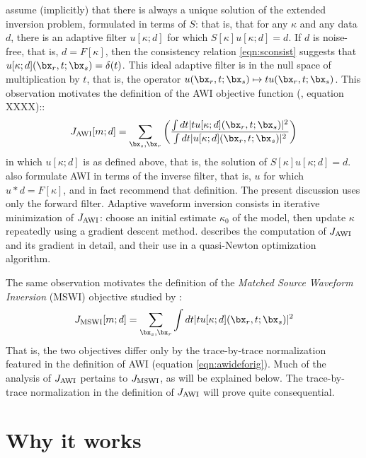 \cite{Warner:16} assume (implicitly) that there is always a unique
solution of the extended inversion problem, formulated in terms of
$S$: that is, that
for any $\kappa$ and any data $d$, there is an
adaptive filter $u[\kappa;d]$ for which
$S[\kappa]u[\kappa;d]= d$. If $d$ is noise-free, that is, $d=F[\kappa]$, then the consistency relation \ref{eqn:sconsist}
suggests that $u[\kappa;d](\bx_r,t;\bx_s) = \delta(t)$. This ideal adaptive filter is in the null
space of multiplication by $t$, that is, the operator
$u(\bx_r,t;\bx_s) \mapsto t u(\bx_r,t;\bx_s)$. This
observation motivates the definition of the AWI objective function
(\cite{Warner:16}, equation XXXX)::
\begin{equation}
  \label{eqn:awideforig}
  J_{\rm AWI}[m;d] = \sum_{\bx_s,\bx_r} \left(\frac{\int dt |tu[\kappa;d](\bx_r,t;\bx_s)|^2}{\int dt |u[\kappa;d](\bx_r,t;\bx_s)|^2}\right) 
\end{equation}
in which $u[\kappa;d]$ is as defined above, that is, the solution of $S[\kappa]u[\kappa;d]
= d$. \cite{Warner:16} also formulate
AWI in terms of the inverse filter, that is, $u$ for which
$u*d = F[\kappa]$, and in fact recommend that definition. The present
discussion uses only the forward filter.
Adaptive waveform inversion consists in iterative minimization of
$J_{\rm AWI}$: choose an initial estimate $\kappa_0$ of the
model, then update $\kappa$ repeatedly using a gradient
descent method. \cite{Warner:16} describes the computation of $J_{\rm AWI}$
and its gradient in detail, and their use in a quasi-Newton
optimization algorithm.

The same observation motivates the definition of the {\em Matched
  Source Waveform Inversion} (MSWI) objective studied by
\cite{HuangSymes2015SEG,HuangSymes:Geo17}:
\begin{equation}
  \label{eqn:mswideforig}
  J_{\rm MSWI}[m;d] = \sum_{\bx_s,\bx_r} \int dt |tu[\kappa;d](\bx_r,t;\bx_s)|^2
\end{equation}
That is, the two objectives differ only by the trace-by-trace
normalization featured in the definition of AWI (equation
\ref{eqn:awideforig}). Much of the analysis of $J_{\rm AWI}$ pertains to
$J_{\rm MSWI}$, as will be explained below.
The trace-by-trace normalization in the definition of $J_{\rm AWI}$
will prove quite consequential.

\section{Why it works}

